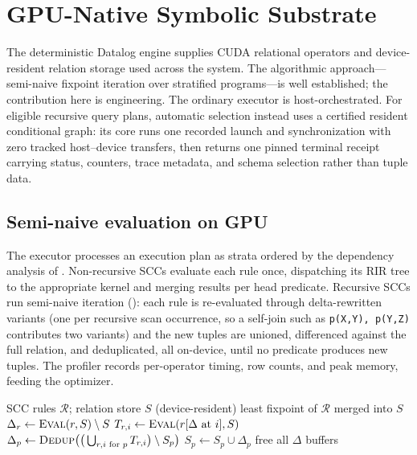 \section{GPU-Native Symbolic Substrate}\label{sec:datalog}

The deterministic Datalog engine supplies CUDA relational operators and device-resident relation storage used across the system. The algorithmic approach---semi-naive fixpoint iteration over stratified programs---is well established; the contribution here is engineering. The ordinary executor is host-orchestrated. For eligible recursive query plans, automatic selection instead uses a certified resident conditional graph: its core runs one recorded launch and synchronization with zero tracked host--device transfers, then returns one pinned terminal receipt carrying status, counters, trace metadata, and schema selection rather than tuple data.

\subsection{Semi-naive evaluation on GPU}

The executor processes an execution plan as strata ordered by the dependency analysis of . Non-recursive SCCs evaluate each rule once, dispatching its RIR tree to the appropriate kernel and merging results per head predicate. Recursive SCCs run semi-naive iteration (): each rule is re-evaluated through delta-rewritten variants (one per recursive scan occurrence, so a self-join such as \texttt{p(X,Y), p(Y,Z)} contributes two variants) and the new tuples are unioned, differenced against the full relation, and deduplicated, all on-device, until no predicate produces new tuples. The profiler records per-operator timing, row counts, and peak memory, feeding the optimizer.

\begin{algorithm}[htbp]
\caption{GPU semi-naive evaluation of a recursive SCC. All buffers are device-resident.}
\label{alg:seminaive}
\begin{algorithmic}[1]
\Require SCC rules $\mathcal{R}$; relation store $S$ (device-resident)
\Ensure least fixpoint of $\mathcal{R}$ merged into $S$
  \State $\Delta_r \gets \textsc{Eval}(r, S) \setminus S$ 
\EndFor
\Repeat
    \State $T_{r,i} \gets \textsc{Eval}(r[\Delta \text{ at } i], S)$ 
  \EndFor
    \State $\Delta_p \gets \textsc{Dedup}\big(\big(\textstyle\bigcup_{r,i \text{ for } p} T_{r,i}\big) \setminus S_p\big)$
    \State $S_p \gets S_p \cup \Delta_p$ 
  \EndFor
{}
\State free all $\Delta$ buffers
\end{algorithmic}
\end{algorithm}

